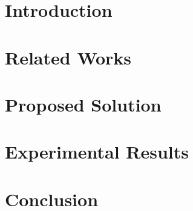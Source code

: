 \documentclass[a4paper,12pt,oneside]{book}
\theoremstyle{definition}
\theoremstyle{definition}
\newcommand\blankpage{%
	\clearpage
	\thispagestyle{plain}
	\null
	\newpage}
\begin{document}

	\tableofcontents
	\listoftables
	\listoffigures	
	

	\frontmatter	{\tiny }
	\mainmatter
		
	\chapter{Introduction}
	\label{cap:chapter1}
	
	
	\chapter{Related Works}
	\label{cap:chapter2}
	
	
	\chapter{Proposed Solution}
	\label{cap:chapter3}
	
	
	\chapter{Experimental Results}
	\label{cap:chapter5}
	
	
	\chapter{Conclusion}
	\label{cap:chapter6}
	

	\blankpage
	

	 
	
	
\end{document}
